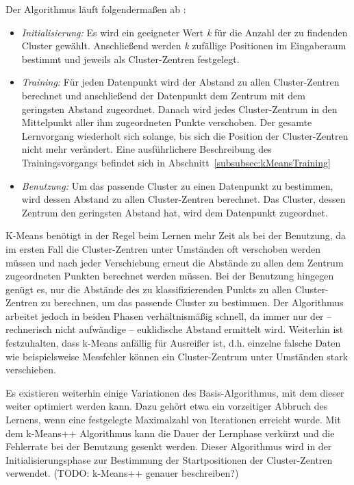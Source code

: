 Der Algorithmus läuft folgendermaßen ab \cite{Marsland}:
\begin{itemize}

\item \emph{Initialisierung:} Es wird ein geeigneter Wert \emph{k} für die Anzahl der zu findenden Cluster gewählt.
Anschließend werden \emph{k} zufällige Positionen im Eingaberaum bestimmt und jeweils als Cluster-Zentren festgelegt.
\item \emph{Training:} Für jeden Datenpunkt wird der Abstand zu allen Cluster-Zentren berechnet und anschließend der Datenpunkt dem Zentrum mit dem geringsten Abstand zugeordnet. 
Danach wird jedes Cluster-Zentrum in den Mittelpunkt aller ihm zugeordneten Punkte verschoben.
Der gesamte Lernvorgang wiederholt sich solange, bis sich die Position der Cluster-Zentren nicht mehr verändert. Eine ausführlichere Beschreibung des Trainingsvorgangs befindet sich in Abschnitt~\ref{subsubsec:kMeansTraining}
\item \emph{Benutzung:} Um das passende Cluster zu einen Datenpunkt zu bestimmen, wird dessen Abstand zu allen Cluster-Zentren berechnet. Das Cluster, dessen Zentrum den geringsten Abstand hat, wird dem Datenpunkt zugeordnet.
\end{itemize}

K-Means benötigt in der Regel beim Lernen mehr Zeit als bei der Benutzung, da im ersten Fall die Cluster-Zentren unter Umständen oft verschoben werden müssen und nach jeder Verschiebung erneut die Abstände zu allen dem Zentrum zugeordneten Punkten berechnet werden müssen. Bei der Benutzung hingegen genügt es, nur die Abstände des zu klassifizierenden Punkts zu allen Cluster-Zentren zu berechnen, um das passende Cluster zu bestimmen. Der Algorithmus arbeitet jedoch
in beiden Phasen verhältnismäßig schnell, da immer nur 
der -- rechnerisch nicht aufwändige -- euklidische Abstand ermittelt wird.
Weiterhin ist festzuhalten, dass k-Means anfällig für Ausreißer ist, d.h. einzelne falsche Daten wie beispielsweise Messfehler können ein Cluster-Zentrum unter Umständen stark verschieben.

Es existieren weiterhin einige Variationen des Basis-Algorithmus, mit dem dieser weiter optimiert werden kann. Dazu gehört etwa ein vorzeitiger Abbruch des Lernens, wenn eine festgelegte Maximalzahl von Iterationen erreicht wurde. Mit dem k-Means++ Algorithmus \cite{kMeans++} kann die Dauer der Lernphase verkürzt und die Fehlerrate bei der Benutzung gesenkt werden. Dieser Algorithmus wird in der Initialisierungsphase zur Bestimmung der Startpositionen der Cluster-Zentren verwendet. 
(TODO: k-Means++ genauer beschreiben?) %


